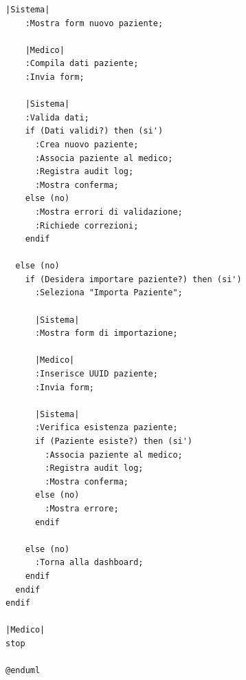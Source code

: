 \documentclass[12pt,a4paper,oneside]{report}
\begin{document}
\begin{lstlisting}[basicstyle=\small\ttfamily, breaklines=true, caption={gestione del paziente}]
    |Sistema|
    :Mostra form nuovo paziente;
    
    |Medico|
    :Compila dati paziente;
    :Invia form;
    
    |Sistema|
    :Valida dati;
    if (Dati validi?) then (si')
      :Crea nuovo paziente;
      :Associa paziente al medico;
      :Registra audit log;
      :Mostra conferma;
    else (no)
      :Mostra errori di validazione;
      :Richiede correzioni;
    endif
    
  else (no)
    if (Desidera importare paziente?) then (si')
      :Seleziona "Importa Paziente";
      
      |Sistema|
      :Mostra form di importazione;
      
      |Medico|
      :Inserisce UUID paziente;
      :Invia form;
      
      |Sistema|
      :Verifica esistenza paziente;
      if (Paziente esiste?) then (si')
        :Associa paziente al medico;
        :Registra audit log;
        :Mostra conferma;
      else (no)
        :Mostra errore;
      endif
      
    else (no)
      :Torna alla dashboard;
    endif
  endif
endif

|Medico|
stop

@enduml

\end{lstlisting}
\end{document}
